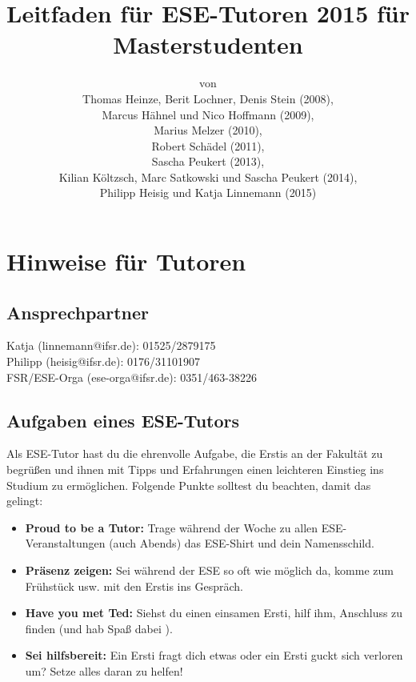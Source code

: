 \documentclass[a4paper,12pt]{report}
\begin{document}
\title{\textbf{Leitfaden für ESE-Tutoren 2015 für Masterstudenten}\\}
\date{}
\author{von\\Thomas Heinze, Berit Lochner, Denis Stein (2008), \\Marcus Hähnel und Nico Hoffmann (2009), \\Marius Melzer (2010), \\Robert Schädel (2011),\\Sascha Peukert (2013), \\Kilian Költzsch, Marc Satkowski und Sascha Peukert (2014), \\Philipp Heisig und Katja Linnemann (2015)}
\maketitle
\tableofcontents
\chapter{Hinweise für Tutoren}
\section{Ansprechpartner}
Katja (linnemann@ifsr.de): 01525/2879175\\
Philipp (heisig@ifsr.de): 0176/31101907 \\
FSR/ESE-Orga (ese-orga@ifsr.de): 0351/463-38226

\section{Aufgaben eines ESE-Tutors}
Als ESE-Tutor hast du die ehrenvolle Aufgabe, die Erstis an der Fakultät zu begrüßen und ihnen mit Tipps und Erfahrungen einen leichteren Einstieg ins Studium zu ermöglichen. Folgende Punkte solltest du beachten, damit das gelingt:
\begin{itemize}
	\item \textbf{Proud to be a Tutor:} Trage während der Woche zu allen ESE-Veranstaltungen (auch Abends) das ESE-Shirt und dein Namensschild.
	\item \textbf{Präsenz zeigen:} Sei während der ESE so oft wie möglich da, komme zum Frühstück usw. mit den Erstis ins Gespräch.
	\item \textbf{Have you met Ted:} Siehst du einen einsamen Ersti, hilf ihm, Anschluss zu finden (und hab Spaß dabei \Winkey ).
	\item \textbf{Sei hilfsbereit:} Ein Ersti fragt dich etwas oder ein Ersti guckt sich verloren um? Setze alles daran zu helfen!
\end{itemize}
\end{document}

